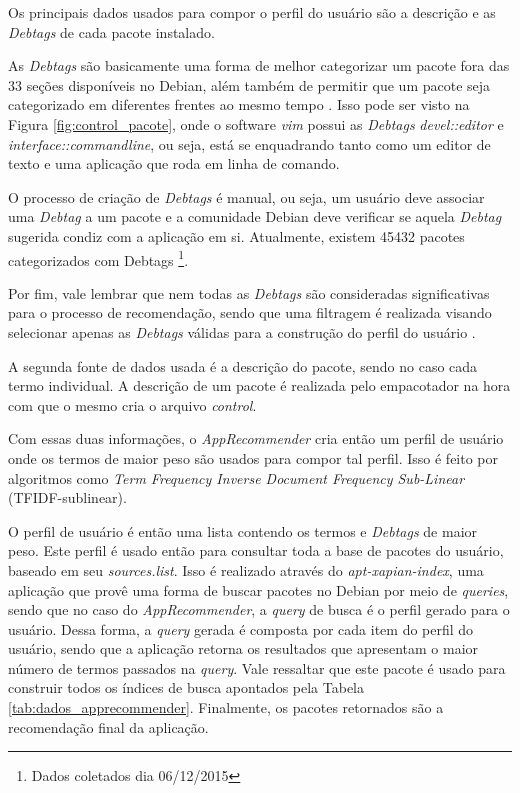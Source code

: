 Os principais dados usados para compor o perfil do usuário são a
descrição e as \textit{Debtags} de cada pacote instalado.

As \textit{Debtags} são basicamente uma forma de melhor categorizar um pacote fora das 33
seções disponíveis no Debian, além também de permitir que um pacote seja
categorizado em diferentes frentes ao mesmo tempo \cite{zini2005cute}. Isso pode ser visto na Figura
\ref{fig:control_pacote}, onde o software \textit{vim} possui as
\textit{Debtags} \textit{devel::editor} e \textit{interface::commandline}, ou seja, está se
enquadrando tanto como um editor de texto e uma aplicação que roda em linha de
comando.

O processo de criação de \textit{Debtags} é manual, ou seja, um usuário deve associar uma
\textit{Debtag} a um pacote e a comunidade Debian deve verificar se aquela
\textit{Debtag} sugerida condiz com a aplicação em si. Atualmente, existem 45432 pacotes
categorizados com Debtags \footnote{Dados
coletados dia 06/12/2015}.

Por fim, vale lembrar que nem todas as \textit{Debtags} são consideradas significativas
para o processo de recomendação, sendo que uma filtragem é realizada visando
selecionar apenas as \textit{Debtags} válidas para a construção do perfil do usuário
\cite{araujo2011apprecommender}.

A segunda fonte de dados usada é a descrição do pacote, sendo no caso cada termo
individual. A descrição de um pacote é realizada pelo empacotador na hora com
que o mesmo cria o arquivo \textit{control}.

Com essas duas informações, o \textit{AppRecommender} cria então um perfil de usuário
onde os termos de maior peso são usados para compor tal perfil. Isso é feito por
algoritmos como \textit{Term Frequency Inverse Document Frequency Sub-Linear}
(TFIDF-sublinear).

O perfil de usuário é então uma lista contendo os termos e \textit{Debtags} de maior
peso. Este perfil é usado então para consultar toda a base de pacotes
do usuário, baseado em seu \textit{sources.list}.
Isso é realizado através do \textit{apt-xapian-index}, uma aplicação
que provê uma forma de buscar pacotes no Debian por meio de \textit{queries}, sendo que no
caso do \textit{AppRecommender}, a \textit{query} de busca é o perfil gerado para o usuário. Dessa
forma, a \textit{query} gerada é composta por cada item do perfil do usuário, sendo que a
aplicação retorna os resultados que apresentam o maior número de termos passados
na \textit{query}.
Vale ressaltar que este pacote é usado para construir todos os índices de busca
apontados pela Tabela \ref{tab:dados_apprecommender}.
Finalmente, os pacotes retornados são a recomendação final da aplicação.

